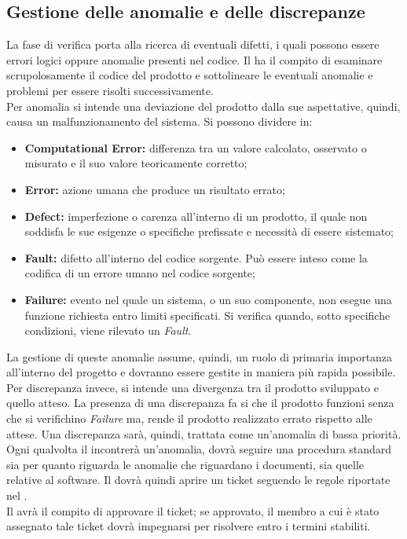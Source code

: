	\subsection{Gestione delle anomalie e delle discrepanze}
	La fase di verifica porta alla ricerca di eventuali difetti, i quali possono essere errori logici oppure anomalie presenti nel codice. Il \roleVerifier{} ha il compito di esaminare scrupolosamente il codice del prodotto e sottolineare le eventuali anomalie e problemi per essere risolti successivamente.\\
	Per anomalia si intende una deviazione del prodotto dalla sue aspettative, quindi, causa un malfunzionamento del sistema. Si possono dividere in:
	\begin{itemize}
		\item \textbf{Computational Error:} differenza tra un valore calcolato, osservato o misurato e il suo valore teoricamente corretto;
		\item \textbf{Error:} azione umana che produce un risultato errato;
		\item \textbf{Defect:} imperfezione o carenza all'interno di un prodotto, il quale non soddisfa le sue esigenze o specifiche prefissate e necessità di essere sistemato;
		\item \textbf{Fault:} difetto all'interno del codice sorgente. Può essere inteso come la codifica di un errore umano nel codice sorgente;
		\item \textbf{Failure:} evento nel quale un sistema, o un suo componente, non esegue una funzione richiesta entro limiti specificati. Si verifica quando, sotto specifiche condizioni, viene rilevato un \emph{Fault}.
	\end{itemize}
	La gestione di queste anomalie assume, quindi, un ruolo di primaria importanza all'interno del progetto e dovranno essere gestite in maniera più rapida possibile.\\
	Per discrepanza invece, si intende una divergenza tra il prodotto sviluppato e quello atteso. La presenza di una discrepanza fa si che il prodotto funzioni senza che si verifichino \emph{Failure} ma, rende il prodotto realizzato errato rispetto alle attese. Una discrepanza sarà, quindi, trattata come un'anomalia di bassa priorità.\\
	Ogni qualvolta il \roleVerifier{} incontrerà un'anomalia, dovrà seguire una procedura standard sia per quanto riguarda le anomalie che riguardano i documenti, sia quelle relative al software. Il \roleVerifier{} dovrà quindi aprire un ticket seguendo le regole riportate nel \docNameVersionNdP.\\
	Il \roleProjectManager{} avrà il compito di approvare il ticket; se approvato, il membro a cui è stato assegnato tale ticket dovrà impegnarsi per risolvere entro i termini stabiliti.
	
